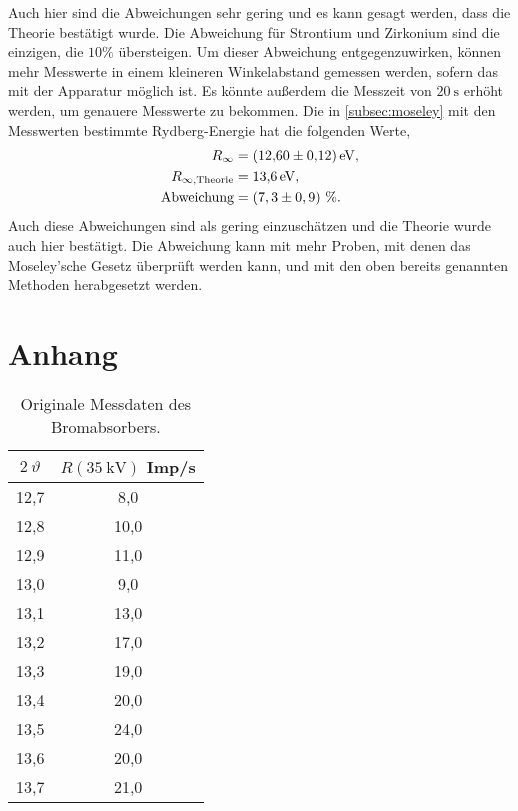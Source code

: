 Auch hier sind die Abweichungen sehr gering und es kann gesagt werden, dass die Theorie bestätigt wurde. Die Abweichung für Strontium und Zirkonium sind die einzigen, die $10 \%$ übersteigen. Um
dieser Abweichung entgegenzuwirken, können mehr Messwerte in einem kleineren Winkelabstand gemessen werden, sofern das mit der Apparatur möglich ist. Es könnte außerdem die
Messzeit von $\SI{20}{\second}$ erhöht werden, um genauere Messwerte zu bekommen.\newline
Die in \autoref{subsec:moseley} mit den Messwerten bestimmte Rydberg-Energie hat die folgenden Werte,
\begin{align*}
    R_\infty &= \SI{12,60 (0,12)}{\eV}, \\
    R_{\infty, \text{Theorie}} &= \SI{13,6}{\eV}, \\
    \text{Abweichung} &= (7,3 \pm 0,9) ~\%.
\end{align*}
Auch diese Abweichungen sind als gering einzuschätzen und die Theorie wurde auch hier bestätigt. Die Abweichung kann mit mehr Proben, mit denen das Moseley'sche Gesetz
überprüft werden kann, und mit den oben bereits genannten Methoden herabgesetzt werden.

\printbibliography{}

\section*{Anhang}
\label{sec:anhang}

\begin{table}[H]
    \caption{Originale Messdaten des Bromabsorbers.}
    \centering
    \label{tab:origDaten2}
    \begin{tabular}{c c}
        \toprule
        $2~\vartheta$ & $R(\SI{35}{\kilo\volt})$ Imp/s \\
        \midrule
        12,7  &  8,0  \\
        12,8  &  10,0  \\
        12,9  &  11,0  \\
        13,0  &  9,0  \\
        13,1  &  13,0  \\
        13,2  &  17,0  \\
        13,3  &  19,0  \\
        13,4  &  20,0  \\
        13,5  &  24,0  \\
        13,6  &  20,0  \\
        13,7  &  21,0  \\
        \bottomrule
    \end{tabular}
\end{table}

